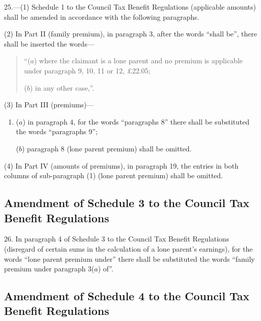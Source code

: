 \documentclass[a4paper]{article}
\begin{document}
25.—(1) Schedule 1 to the Council Tax Benefit Regulations (applicable amounts) shall be amended in accordance with the following paragraphs.

(2) In Part II (family premium), in paragraph 3, after the words “shall be”, there shall be inserted the words—
\begin{quotation}
“($a$) where the claimant is a lone parent and no premium is applicable under paragraph 9, 10, 11 or 12, £22.05;

($b$) in any other case,”.
\end{quotation}

(3) In Part III (premiums)—
\begin{enumerate}\item[]
($a$) in paragraph 4, for the words “paragraphs 8” there shall be substituted the words “paragraphs 9”;

($b$) paragraph 8 (lone parent premium) shall be omitted.
\end{enumerate}

(4) In Part IV (amounts of premiums), in paragraph 19, the entries in both columns of sub-paragraph (1) (lone parent premium) shall be omitted.

\subsection[26. Amendment of Schedule 3 to the Council Tax Benefit Regulations]{Amendment of Schedule 3 to the Council Tax Benefit Regulations}

26.  In paragraph 4 of Schedule 3 to the Council Tax Benefit Regulations (disregard of certain sums in the calculation of a lone parent’s earnings), for the words “lone parent premium under” there shall be substituted the words “family premium under paragraph 3($a$) of”.

\subsection[27. Amendment of Schedule 4 to the Council Tax Benefit Regulations]{Amendment of Schedule 4 to the Council Tax Benefit Regulations}
\end{document}
